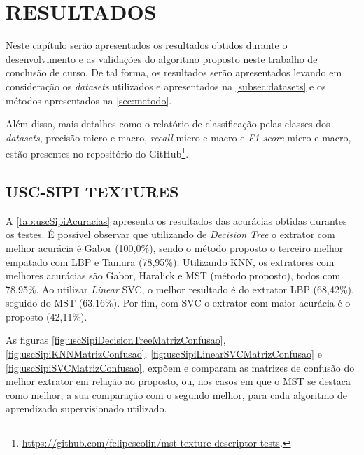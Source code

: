 
\chapter{RESULTADOS}
\label{chap:resultados}

\par Neste capítulo serão apresentados os resultados obtidos durante o desenvolvimento e as validações do algoritmo proposto neste trabalho de conclusão de curso. De tal forma, os resultados serão apresentados levando em consideração os \textit{datasets} utilizados e apresentados na \autoref{subsec:datasets} e os métodos apresentados na \autoref{sec:metodo}.
\par Além disso, mais detalhes como o relatório de classificação pelas classes dos \textit{datasets}, precisão micro e macro, \textit{recall} micro e macro e \textit{F1-score} micro e macro, estão presentes no repositório do GitHub\footnote{\url{https://github.com/felipeseolin/mst-texture-descriptor-tests}.}.

\section{USC-SIPI TEXTURES}
\label{sec:uscSipiTextures}

A \autoref{tab:uscSipiAcuracias} apresenta os resultados das acurácias obtidas durantes os testes. É possível observar que utilizando de \textit{Decision Tree} o extrator com melhor acurácia é Gabor (100,0\%), sendo o método proposto o terceiro melhor empatado com LBP e Tamura (78,95\%). Utilizando KNN, os extratores com melhores acurácias são Gabor, Haralick e MST (método proposto), todos com 78,95\%. Ao utilizar \textit{Linear} SVC, o melhor resultado é do extrator LBP (68,42\%), seguido do MST (63,16\%). Por fim, com SVC o extrator com maior acurácia é o proposto (42,11\%).



\par As figuras \ref{fig:uscSipiDecisionTreeMatrizConfusao}, \ref{fig:uscSipiKNNMatrizConfusao}, \ref{fig:uscSipiLinearSVCMatrizConfusao} e \ref{fig:uscSipiSVCMatrizConfusao}, expõem e comparam as matrizes de confusão do melhor extrator em relação ao proposto, ou, nos casos em que o MST se destaca como melhor, a sua comparação com o segundo melhor, para cada algoritmo de aprendizado supervisionado utilizado.

